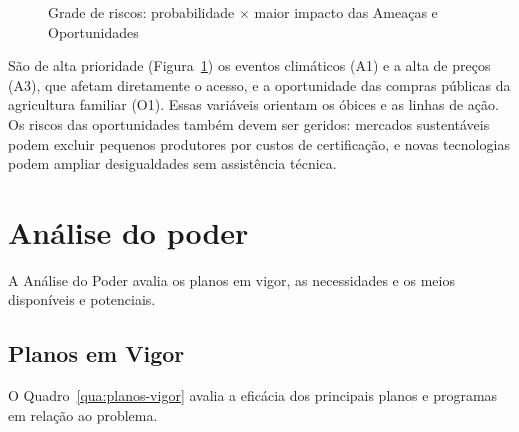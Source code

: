 \documentclass[
	12pt,				%
	openright,			%
	oneside,			%
	a4paper,			%
	chapter=TITLE,		%
	section=TITLE,		%
	english,			%
	french,				%
	spanish,			%
	brazil,				%
 ]{abntex2}
\begin{document}
\begin{figure}[!htbp]
\centering
\caption{Grade de riscos: probabilidade $\times$ maior impacto das Ameaças e Oportunidades}
\label{fig:grade-riscos}
\end{figure}

São de alta prioridade (Figura~\ref{fig:grade-riscos}) os eventos climáticos (A1) e a alta de preços (A3), que
afetam diretamente o acesso, e a oportunidade das compras públicas da
agricultura familiar (O1). Essas variáveis orientam os óbices e as linhas de
ação. Os riscos das oportunidades também devem ser geridos: mercados
sustentáveis podem excluir pequenos produtores por custos de certificação, e
novas tecnologias podem ampliar desigualdades sem assistência técnica.

\section{Análise do poder}
A Análise do Poder avalia os planos em vigor, as necessidades e os meios
disponíveis e potenciais.

\subsection{Planos em Vigor}
O Quadro~\ref{qua:planos-vigor} avalia a eficácia dos principais planos e
programas em relação ao problema.
\end{document}
